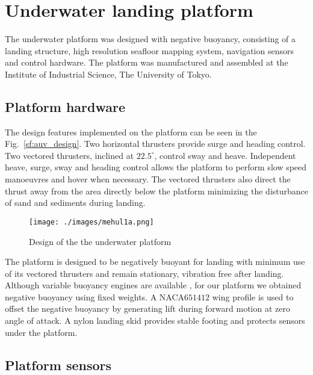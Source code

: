 \section{Underwater landing platform}

 The underwater platform was designed with negative buoyancy, consisting of a landing structure, high resolution seafloor mapping system, navigation sensors and control hardware. The platform was manufactured and assembled at the Institute of Industrial Science, The University of Tokyo.


\subsection{Platform hardware}

 The design features implemented on the platform can be seen in the Fig.~\ref{sf:auv_design}. Two horizontal thrusters provide surge and heading control. Two vectored thrusters, inclined at $22.5^\circ$, control sway and heave. Independent heave, surge, sway and heading control allows the platform to perform slow speed manoeuvres and hover when necessary. The vectored thrusters also direct the thrust away from the area directly below the platform minimizing the disturbance of sand and sediments during landing. 

\begin{figure}[!ht]
\centering\texttt{[image: ./images/mehul1a.png]}
\caption{Design of the the underwater platform}
\label{f:mehul1a}
\end{figure}

The platform is designed to be negatively buoyant for landing with minimum use of its vectored thrusters and remain stationary, vibration free after landing. Although variable buoyancy engines are available \cite{Zhao2008}, for our platform we obtained negative buoyancy using fixed weights. A NACA$651412$ wing profile is used to offset the negative buoyancy by generating lift during forward motion at zero angle of attack. A nylon landing skid provides stable footing and protects sensors under the platform. 


\subsection{Platform sensors}

